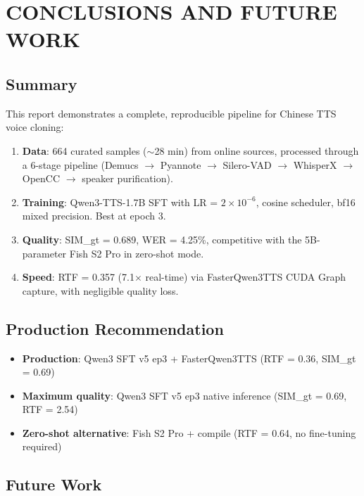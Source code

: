 \documentclass{ar-1col}
\begin{document}
\section{CONCLUSIONS AND FUTURE WORK}

\subsection{Summary}

This report demonstrates a complete, reproducible pipeline for Chinese TTS voice cloning:

\begin{enumerate}
    \item \textbf{Data}: 664 curated samples ($\sim$28 min) from online sources, processed through a 6-stage pipeline (Demucs $\to$ Pyannote $\to$ Silero-VAD $\to$ WhisperX $\to$ OpenCC $\to$ speaker purification).
    \item \textbf{Training}: Qwen3-TTS-1.7B SFT with LR = $2\times10^{-6}$, cosine scheduler, bf16 mixed precision. Best at epoch 3.
    \item \textbf{Quality}: SIM\_gt = 0.689, WER = 4.25\%, competitive with the 5B-parameter Fish S2 Pro in zero-shot mode.
    \item \textbf{Speed}: RTF = 0.357 (7.1$\times$ real-time) via FasterQwen3TTS CUDA Graph capture, with negligible quality loss.
\end{enumerate}

\subsection{Production Recommendation}

\begin{issues}
\begin{itemize}
    \item[-] \textbf{Production}: Qwen3 SFT v5 ep3 + FasterQwen3TTS (RTF = 0.36, SIM\_gt = 0.69)
    \item[-] \textbf{Maximum quality}: Qwen3 SFT v5 ep3 native inference (SIM\_gt = 0.69, RTF = 2.54)
    \item[-] \textbf{Zero-shot alternative}: Fish S2 Pro + compile (RTF = 0.64, no fine-tuning required)
\end{itemize}
\end{issues}

\subsection{Future Work}
\end{document}
